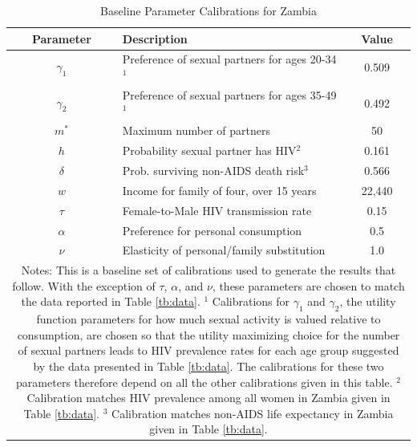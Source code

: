 \documentclass[12pt]{article}
\begin{document}
\begin{table}
\begin{center}
\caption{Baseline Parameter Calibrations for Zambia}\label{tb:parms}
\vspace*{1pc}
\begin{tabular}{c|l|c}\hline\hline
Parameter & Description & Value \\\hline
$\gamma_1$ & Preference of sexual partners for ages 20-34$^1$ & 0.509  \\
$\gamma_2$ & Preference of sexual partners for ages 35-49$^1$ & 0.492  \\
$m^*$ & Maximum number of partners & 50 \\
$h$ & Probability sexual partner has HIV$^2$ & 0.161  \\
$\delta$ & Prob. surviving non-AIDS death risk$^3$ & 0.566  \\
$w$ & Income for family of four, over 15 years & 22,440  \\
$\tau$ & Female-to-Male HIV transmission rate & 0.15  \\
$\alpha$ & Preference for personal consumption & 0.5 \\
$\nu$ & Elasticity of personal/family substitution & 1.0 \\ \hline\hline
\multicolumn{3}{p{4.8in}}{\footnotesize{
Notes: This is a baseline set of calibrations used to generate the results that follow.  With the exception of $\tau$, $\alpha$, and $\nu$, these parameters are chosen to match the data reported in Table \ref{tb:data}.\newline
$^1$ Calibrations for $\gamma_1$ and $\gamma_2$, the utility function parameters for how much sexual activity is valued relative to consumption, are chosen so that the utility maximizing choice for the number of sexual partners leads to HIV prevalence rates for each age group suggested by the data presented in Table \ref{tb:data}.  The calibrations for these two parameters therefore depend on all the other calibrations given in this table. \newline
$^2$ Calibration matches HIV prevalence among all women in Zambia given in Table \ref{tb:data}.\newline
$^3$ Calibration matches non-AIDS life expectancy in Zambia given in Table \ref{tb:data}.\newline
 }}
\end{tabular}
\end{center}
\end{table}
\end{document}
